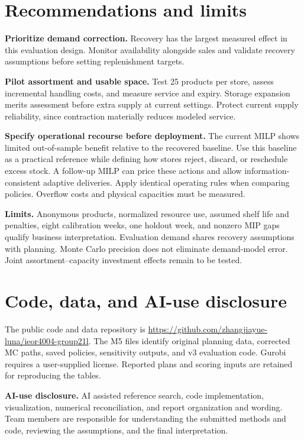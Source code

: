 \documentclass[11pt,letterpaper]{article}
\begin{document}
\clearpage
\section{Recommendations and limits}
\textbf{Prioritize demand correction.} Recovery has the largest measured effect
in this evaluation design. Monitor availability alongside sales and validate
recovery assumptions before setting replenishment targets.

\textbf{Pilot assortment and usable space.} Test 25 products per store, assess
incremental handling costs, and measure service and expiry. Storage expansion
merits assessment before extra supply at current settings. Protect current supply
reliability, since contraction materially reduces modeled service.

\textbf{Specify operational recourse before deployment.} The current MILP shows
limited out-of-sample benefit relative to the recovered baseline. Use this
baseline as a practical reference while defining how stores reject, discard, or
reschedule excess stock. A follow-up MILP can price these actions and allow
information-consistent adaptive deliveries. Apply identical operating rules when
comparing policies. Overflow costs and physical capacities must be measured.

\textbf{Limits.} Anonymous products, normalized resource use, assumed shelf life
and penalties, eight calibration weeks, one holdout week, and nonzero MIP gaps
qualify business interpretation. Evaluation demand shares recovery assumptions
with planning. Monte Carlo precision does not eliminate demand-model error.
Joint assortment--capacity investment effects remain to be tested.

\section{Code, data, and AI-use disclosure}
The public code and data repository is
\url{https://github.com/zhangjiayue-luna/ieor4004-group21l}.
The M5 files identify original planning data, corrected MC paths, saved policies,
sensitivity outputs, and v3 evaluation code. Gurobi requires a user-supplied license.
Reported plans and scoring inputs are retained for reproducing the tables.

\textbf{AI-use disclosure.} AI assisted reference search, code implementation,
visualization, numerical reconciliation, and report organization and wording.
Team members are responsible for understanding the submitted methods and code,
reviewing the assumptions, and the final interpretation.
\end{document}
